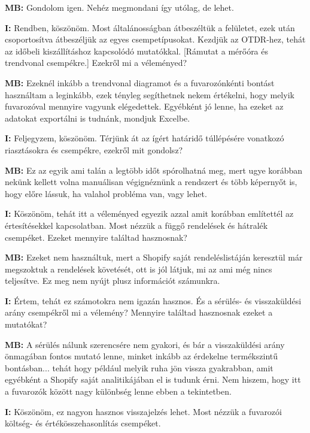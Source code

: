 \documentclass{imc-inf}
\begin{document}
\begin{appendices}
  \noindent\textbf{MB:} Gondolom igen. Nehéz megmondani így utólag, de lehet.

  \noindent\textbf{I:} Rendben, köszönöm. Most általánosságban átbeszéltük a felületet, ezek után csoportosítva átbeszéljük az egyes csempetípusokat. Kezdjük az OTDR-hez, tehát az időbeli kiszállításhoz kapcsolódó mutatókkal. [Rámutat a mérőóra és trendvonal csempékre.] Ezekről mi a véleményed?

  \noindent\textbf{MB:} Ezeknél inkább a trendvonal diagramot és a fuvarozónkénti bontást használtam a leginkább, ezek tényleg segíthetnek nekem értékelni, hogy melyik fuvarozóval mennyire vagyunk elégedettek. Egyébként jó lenne, ha ezeket az adatokat exportálni is tudnánk, mondjuk Excelbe.

  \noindent\textbf{I:} Feljegyzem, köszönöm. Térjünk át az ígért határidő túllépésére vonatkozó riasztásokra és csempékre, ezekről mit gondolsz?

  \noindent\textbf{MB:} Ez az egyik ami talán a legtöbb időt spórolhatná meg, mert ugye korábban nekünk kellett volna manuálisan végignéznünk a rendszert és több képernyőt is, hogy előre lássuk, ha valahol probléma van, vagy lehet.

  \noindent\textbf{I:} Köszönöm, tehát itt a véleményed egyezik azzal amit korábban említettél az értesítésekkel kapcsolatban. Most nézzük a függő rendelések és hátralék csempéket. Ezeket mennyire találtad hasznosnak?

  \noindent\textbf{MB:} Ezeket nem használtuk, mert a Shopify saját rendeléslistáján keresztül már megszoktuk a rendelések követését, ott is jól látjuk, mi az ami még nincs teljesítve. Ez meg nem nyújt plusz információt számunkra.

  \noindent\textbf{I:} Értem, tehát ez számotokra nem igazán hasznos. És a sérülés- és visszaküldési arány csempékről mi a vélemény? Mennyire találtad hasznosnak ezeket a mutatókat?

  \noindent\textbf{MB:} A sérülés nálunk szerencsére nem gyakori, és bár a visszaküldési arány önmagában fontos mutató lenne, minket inkább az érdekelne termékszintű bontásban... tehát hogy például melyik ruha jön vissza gyakrabban, amit egyébként a Shopify saját analitikájában el is tudunk érni. Nem hiszem, hogy itt a fuvarozók között nagy különbség lenne ebben a tekintetben.

  \noindent\textbf{I:} Köszönöm, ez nagyon hasznos visszajelzés lehet. Most nézzük a fuvarozói költség- és értékösszehasonlítás csempéket.


\end{appendices}
\end{document}
